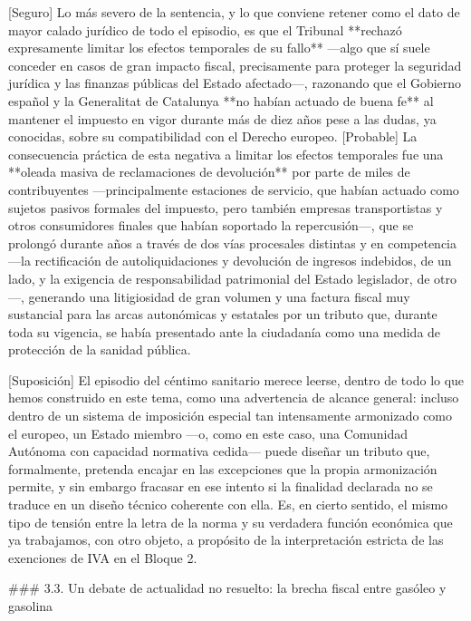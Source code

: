 \documentclass[10pt,a4paper]{article}
\begin{document}
[Seguro] Lo más severo de la sentencia, y lo que conviene retener como el dato de mayor calado jurídico de todo el episodio, es que el Tribunal **rechazó expresamente limitar los efectos temporales de su fallo** —algo que sí suele conceder en casos de gran impacto fiscal, precisamente para proteger la seguridad jurídica y las finanzas públicas del Estado afectado—, razonando que el Gobierno español y la Generalitat de Catalunya **no habían actuado de buena fe** al mantener el impuesto en vigor durante más de diez años pese a las dudas, ya conocidas, sobre su compatibilidad con el Derecho europeo. [Probable] La consecuencia práctica de esta negativa a limitar los efectos temporales fue una **oleada masiva de reclamaciones de devolución** por parte de miles de contribuyentes —principalmente estaciones de servicio, que habían actuado como sujetos pasivos formales del impuesto, pero también empresas transportistas y otros consumidores finales que habían soportado la repercusión—, que se prolongó durante años a través de dos vías procesales distintas y en competencia —la rectificación de autoliquidaciones y devolución de ingresos indebidos, de un lado, y la exigencia de responsabilidad patrimonial del Estado legislador, de otro—, generando una litigiosidad de gran volumen y una factura fiscal muy sustancial para las arcas autonómicas y estatales por un tributo que, durante toda su vigencia, se había presentado ante la ciudadanía como una medida de protección de la sanidad pública.

[Suposición] El episodio del céntimo sanitario merece leerse, dentro de todo lo que hemos construido en este tema, como una advertencia de alcance general: incluso dentro de un sistema de imposición especial tan intensamente armonizado como el europeo, un Estado miembro —o, como en este caso, una Comunidad Autónoma con capacidad normativa cedida— puede diseñar un tributo que, formalmente, pretenda encajar en las excepciones que la propia armonización permite, y sin embargo fracasar en ese intento si la finalidad declarada no se traduce en un diseño técnico coherente con ella. Es, en cierto sentido, el mismo tipo de tensión entre la letra de la norma y su verdadera función económica que ya trabajamos, con otro objeto, a propósito de la interpretación estricta de las exenciones de IVA en el Bloque 2.

### 3.3. Un debate de actualidad no resuelto: la brecha fiscal entre gasóleo y gasolina
\end{document}
